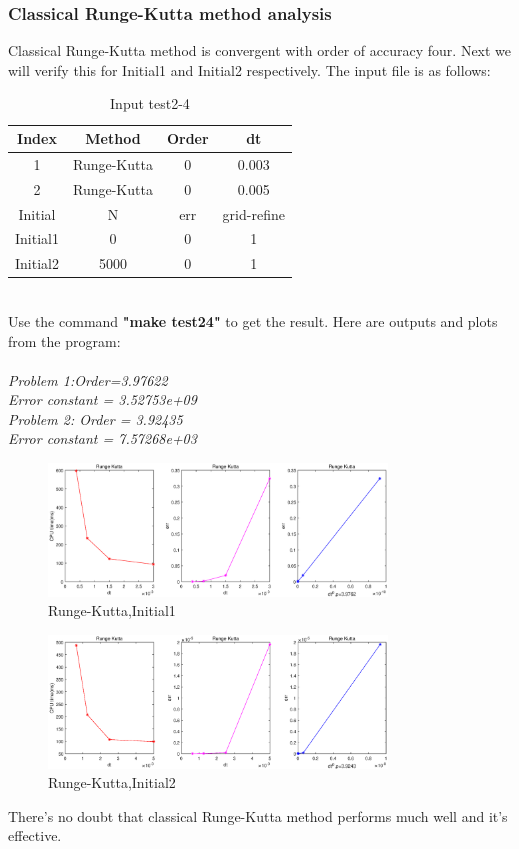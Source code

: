 \documentclass[a4paper,twocolumn]{article}
\theoremstyle{definition}
\begin{document}
\subsubsection{Classical Runge-Kutta method analysis}
Classical Runge-Kutta method is convergent with order of
accuracy four. Next we will verify this for Initial1 and Initial2 respectively. The input file is as follows:
\begin{table}[!htp]
	\centering
	\begin{tabular}{|c|c|c|c|}
		\hline	
		Index & Method & Order & dt \\
		\hline		
		1 & Runge-Kutta & 0 & 0.003   \\	
		\hline		
		2 & Runge-Kutta & 0 & 0.005   \\	
		\hline \hline
		Initial & N & err & grid-refine \\
		\hline
		Initial1 & 0 & 0 & 1 \\
		\hline
		Initial2 & 5000 & 0 & 1 \\
		\hline
	\end{tabular}
	\caption{Input test2-4}
	\label{tab:test24}
\end{table}\\
Use the command \textbf{"make test24"} to get the result. Here are outputs and plots from the program:\\\\
\emph{Problem 1:Order=3.97622}\\
\emph{Error constant = 3.52753e+09}\\
\emph{Problem 2: Order = 3.92435}\\
\emph{Error constant = 7.57268e+03}
\begin{figure}[!htp]   
	\centering
	\includegraphics[width=9cm]{Pictures/2_4_1.eps}
	\caption{Runge-Kutta,Initial1}
	\label{fig:RK1gf}
\end{figure}
\newpage
\begin{figure}[!htp]   
	\centering
	\includegraphics[width=9cm]{Pictures/2_4_2.eps}
	\caption{Runge-Kutta,Initial2}
	\label{fig:RK2gf}
\end{figure}
\noindent There's no doubt that classical Runge-Kutta method performs much well and it's effective.
\end{document}
